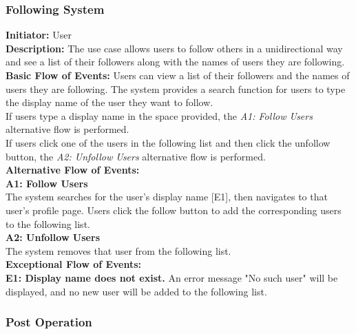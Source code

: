 \documentclass[11pt, a4paper]{article}
\begin{document}
\subsubsection{Following System}

\begin{figure}[H]
    \centering
    
\end{figure}

\textbf{Initiator: }User\\
\textbf{Description: }The use case allows users to follow others in a unidirectional way and see a list of their followers along with the names of users they are following.\\
\textbf{Basic Flow of Events: }Users can view a list of their followers and the names of users they are following. The system provides a search function for users to type the display name of the user they want to follow.\\
If users type a display name in the space provided, the \textit{A1: Follow Users} alternative flow is performed.\\
If users click one of the users in the following list and then click the unfollow button, the \textit{A2: Unfollow Users} alternative flow is performed.\\
\textbf{Alternative Flow of Events: }\\
\textbf{A1: Follow Users}\\
The system searches for the user's display name [E1], then navigates to that user's profile page. Users click the follow button to add the corresponding users to the following list.\\
\textbf{A2: Unfollow Users}\\
The system removes that user from the following list.\\
\textbf{ Exceptional Flow of Events:}\\
\textbf{E1: Display name does not exist.} An error message "No such user" will be displayed, and no new user will be added to the following list.\\


\subsubsection{Post Operation}

\begin{figure}[H]
    \centering
    
\end{figure}
\end{document}
